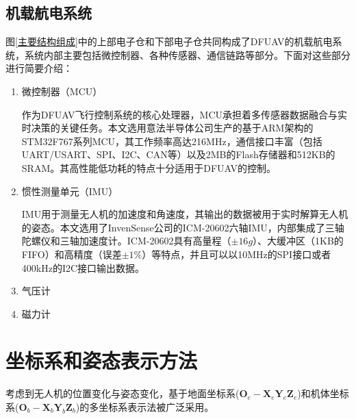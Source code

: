 \subsection{机载航电系统}

图\ref{主要结构组成}中的上部电子仓和下部电子仓共同构成了DFUAV的机载航电系统，系统内部主要包括微控制器、各种传感器、通信链路等部分。下面对这些部分进行简要介绍：

\begin{enumerate}[topsep = 0 pt, itemsep= 0 pt, parsep=0pt, partopsep=0pt, leftmargin=44pt, itemindent=0pt, labelsep=6pt, label=(\arabic*)]
	\item 微控制器（MCU）

    作为DFUAV飞行控制系统的核心处理器，MCU承担着多传感器数据融合与实时决策的关键任务。本文选用意法半导体公司生产的基于ARM架构的STM32F767系列MCU，其工作频率高达216MHz，通信接口丰富（包括UART/USART、SPI、I2C、CAN等）以及2MB的Flash存储器和512KB的SRAM。其高性能低功耗的特点十分适用于DFUAV的控制。

    \item 惯性测量单元（IMU）

    IMU用于测量无人机的加速度和角速度，其输出的数据被用于实时解算无人机的姿态。本文选用了InvenSense公司的ICM-20602六轴IMU，内部集成了三轴陀螺仪和三轴加速度计。ICM-20602具有高量程（$\pm16g$）、大缓冲区（1KB的FIFO）和高精度（误差$\pm1\%$）等特点，并且可以以10MHz的SPI接口或者400kHz的I2C接口输出数据。

    \item 气压计

    \item 磁力计
\end{enumerate}

\section{坐标系和姿态表示方法}

考虑到无人机的位置变化与姿态变化，基于地面坐标系($\boldsymbol{O}_e-\boldsymbol{X}_e\boldsymbol{Y}_e\boldsymbol{Z}_e $)和机体坐标系(${\boldsymbol{O}_b}-{\boldsymbol{X}_b}{\boldsymbol{Y}_b}{\boldsymbol{Z}_b}$)的多坐标系表示法被广泛采用。

